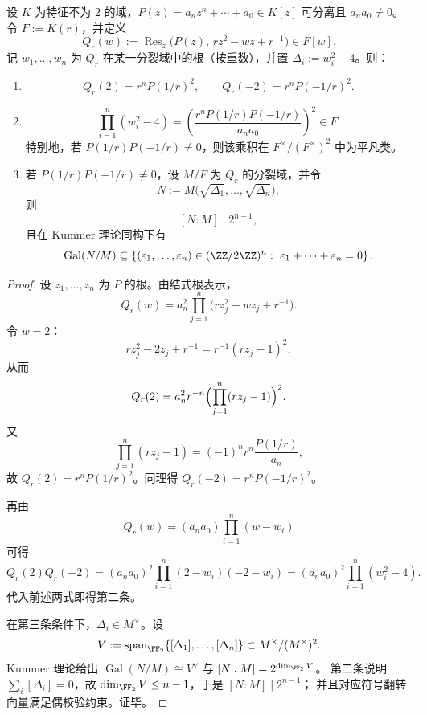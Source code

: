 \begin{theorem}[临界值平方性与偶符号亏损]\label{thm:xi-terminal-zm-jg-critical-square-even-sign-defect}
设 \(K\) 为特征不为 \(2\) 的域，\(P(z)=a_n z^n+\cdots+a_0\in K[z]\) 可分离且 \(a_n a_0\neq 0\)。令 \(F:=K(r)\)，并定义
\[
Q_r(w):=\operatorname{Res}_z\!\bigl(P(z),\,r z^2-w z+r^{-1}\bigr)\in F[w].
\]
记 \(w_1,\dots,w_n\) 为 \(Q_r\) 在某一分裂域中的根（按重数），并置 \(\Delta_i:=w_i^2-4\)。则：
\begin{enumerate}
  \item
  \[
  Q_r(2)=r^n P(1/r)^2,\qquad Q_r(-2)=r^n P(-1/r)^2.
  \]
  \item
  \[
  \prod_{i=1}^n (w_i^2-4)=
  \left(\frac{r^n P(1/r)P(-1/r)}{a_n a_0}\right)^2\in F.
  \]
  特别地，若 \(P(1/r)P(-1/r)\neq 0\)，则该乘积在 \(F^\times/(F^\times)^2\) 中为平凡类。
  \item 若 \(P(1/r)P(-1/r)\neq 0\)，设 \(M/F\) 为 \(Q_r\) 的分裂域，并令
  \[
  N:=M\bigl(\sqrt{\Delta_1},\dots,\sqrt{\Delta_n}\bigr),
  \]
  则
  \[
  [N:M]\mid 2^{n-1},
  \]
  且在 Kummer 理论同构下有
  \[
  \operatorname{Gal}(N/M)\subseteq
  \left\{
  (\varepsilon_1,\dots,\varepsilon_n)\in (\ZZ/2\ZZ)^n:\ \varepsilon_1+\cdots+\varepsilon_n=0
  \right\}.
  \]
\end{enumerate}
\end{theorem}
\begin{proof}
设 \(z_1,\dots,z_n\) 为 \(P\) 的根。由结式根表示，
\[
Q_r(w)=a_n^2\prod_{j=1}^n \bigl(r z_j^2-w z_j+r^{-1}\bigr).
\]
令 \(w=2\)：
\[
r z_j^2-2z_j+r^{-1}=r^{-1}(r z_j-1)^2,
\]
从而
\[
Q_r(2)=a_n^2 r^{-n}\Bigl(\prod_{j=1}^n (r z_j-1)\Bigr)^2.
\]
又
\[
\prod_{j=1}^n (r z_j-1)
=(-1)^n r^n \frac{P(1/r)}{a_n},
\]
故 \(Q_r(2)=r^n P(1/r)^2\)。同理得 \(Q_r(-2)=r^n P(-1/r)^2\)。

再由
\[
Q_r(w)=(a_n a_0)\prod_{i=1}^n (w-w_i)
\]
可得
\[
Q_r(2)Q_r(-2)
=(a_n a_0)^2\prod_{i=1}^n (2-w_i)(-2-w_i)
=(a_n a_0)^2\prod_{i=1}^n (w_i^2-4).
\]
代入前述两式即得第二条。

在第三条条件下，\(\Delta_i\in M^\times\)。设
\[
V:=\operatorname{span}_{\FF_2}\{[\Delta_1],\dots,[\Delta_n]\}\subset M^\times/(M^\times)^2.
\]
Kummer 理论给出
\(
\operatorname{Gal}(N/M)\cong V^\vee
\)
与
\(
[N:M]=2^{\dim_{\FF_2}V}
\)。
第二条说明
\(
\sum_i [\Delta_i]=0
\)，故 \(\dim_{\FF_2}V\le n-1\)，于是 \([N:M]\mid 2^{n-1}\)；
并且对应符号翻转向量满足偶校验约束。证毕。
\end{proof}

